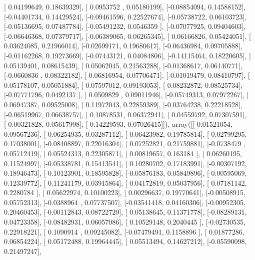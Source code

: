 \documentclass{article}
\begin{document}
       [ 0.04199649,  0.18639329],
       [ 0.0953752 ,  0.05180199],
       [-0.08854094,  0.14588152],
       [-0.04401734,  0.14429524],
       [-0.09461596,  0.22527674],
       [-0.05738722,  0.06103723],
       [-0.05136695,  0.07487784],
       [-0.05491232,  0.0546359 ],
       [-0.07077925,  0.09404603],
       [-0.06646368,  0.07379717],
       [-0.06389065,  0.06265345],
       [ 0.06166826,  0.05424051],
       [ 0.03624085,  0.21966014],
       [-0.02699171,  0.19680617],
       [-0.06436984,  0.09705888],
       [-0.01162268,  0.19273669],
       [-0.07443121,  0.04084806],
       [-0.14115464,  0.18220605],
       [ 0.05139401,  0.08615439],
       [ 0.05062045,  0.21563288],
       [-0.01368617,  0.06140771],
       [-0.0660836 ,  0.08322182],
       [ 0.06816954,  0.07706471],
       [-0.01019479,  0.08410797],
       [ 0.05178107,  0.05051884],
       [ 0.07597012,  0.09193053],
       [ 0.08232872,  0.08525734],
       [-0.07771796,  0.0492137 ],
       [ 0.0509829 ,  0.09011946],
       [-0.05749313,  0.07972267],
       [ 0.06947387,  0.09525008],
       [ 0.11972043,  0.22859389],
       [-0.03764238,  0.22218528],
       [-0.06519967,  0.06638757],
       [ 0.10878531,  0.06372941],
       [ 0.04559792,  0.07307591],
       [-0.00321828,  0.05617998],
       [ 0.14229593,  0.07026415]]), array([[-0.01521054,  0.09567236],
       [ 0.06254935,  0.03287112],
       [-0.06423982,  0.19785814],
       [ 0.02799295,  0.17038001],
       [-0.08408897,  0.22016304],
       [ 0.07252821,  0.21759881],
       [-0.0738479 ,  0.05712419],
       [ 0.05524313,  0.22305871],
       [ 0.00819657,  0.163184  ],
       [ 0.06260195,  0.11524997],
       [-0.05338781,  0.15413541],
       [ 0.10280702,  0.17183991],
       [-0.00307192,  0.18946473],
       [ 0.10123901,  0.18595828],
       [-0.05876183,  0.05849896],
       [-0.00595069,  0.12339772],
       [ 0.11241179,  0.03915864],
       [ 0.04172819,  0.05037956],
       [ 0.07181142,  0.2280784 ],
       [ 0.05622974,  0.10100223],
       [ 0.00296637,  0.19770641],
       [-0.00508915,  0.05752313],
       [-0.0388964 ,  0.07737507],
       [-0.03541418,  0.04160306],
       [-0.00952305,  0.20460453],
       [-0.00112843,  0.08722729],
       [ 0.05138645,  0.11371778],
       [-0.08289131,  0.04723358],
       [-0.08482931,  0.06057086],
       [ 0.10529148,  0.2040445 ],
       [-0.02730535,  0.22918221],
       [ 0.1090914 ,  0.09245082],
       [-0.07479491,  0.1158896 ],
       [ 0.01877286,  0.06854224],
       [ 0.05172488,  0.19964445],
       [ 0.05513494,  0.14627212],
       [-0.05590098,  0.21497247],
\end{document}
